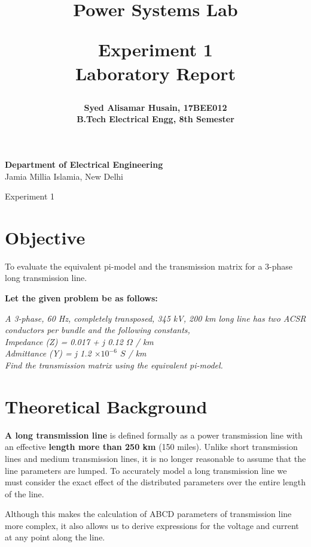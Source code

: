 \documentclass[12pt]{article}
\title{
  {\Huge \bf Power Systems Lab}\\
  \vspace{0.25in}

  {\bf Experiment 1}\\
  Laboratory Report
  \vspace{1in}
}
\author{
  \bf Syed Alisamar Husain, 17BEE012\\
  B.Tech Electrical Engg, 8th Semester
}
\begin{document}
  \begin{titlepage}
    \maketitle
    \vspace*{\fill}
    \begin{center}
      {\bfseries Department of Electrical Engineering} \\
      Jamia Millia Islamia, New Delhi
    \end{center}
    \thispagestyle{empty}
  \end{titlepage}
  
  \newpage
  \begin{center}
    \huge Experiment 1
    \vspace{0.5in}
  \end{center}

  \section{Objective}
  To evaluate the equivalent pi-model and the transmission matrix 
  for a 3-phase long transmission line.

  {\bf Let the given problem be as follows:}
  \begin{center}
    \itshape
    A 3-phase, 60 Hz, completely transposed, 345 kV, 200 km long line
    has two ACSR conductors per bundle and the following constants,\\
    Impedance (Z) =  0.017 + j 0.12 $\Omega$ / km\\
    Admittance (Y) = j 1.2 $\times 10^{-6}$ $S$ / km\\
    Find the transmission matrix using the equivalent pi-model.
  \end{center}

  \section{Theoretical Background}
  {\bf A long transmission line} is defined formally as a power transmission 
  line with an effective {\bf length more than 250 km} (150 miles). 
  Unlike short transmission lines and medium transmission lines, 
  it is no longer reasonable to assume that the line parameters 
  are lumped. To accurately model a long transmission line we 
  must consider the exact effect of the distributed parameters 
  over the entire length of the line. 
  
  Although this makes the calculation of ABCD parameters of 
  transmission line more complex, it also allows us to derive 
  expressions for the voltage and current at any point along the line.
\end{document}
